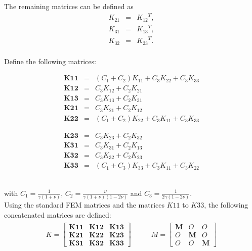 	The remaining matrices can be defined as
	\begin{eqnarray*}
		{K_{21}} & = & {K_{12}}^{T},\\
		{K_{31}} & = & {K_{13}}^{T}, \\
		{K_{32}} & = & {K_{23}}^{T}. \\
	\end{eqnarray*}

	Define the following matrices:\\
	\noindent\begin{minipage}{.5\linewidth}
		\begin{eqnarray*}
			\mathbf{K11} & = & \left(C_1 + C_2 \right) K_{11} + C_3 K_{22} + C_3 K_{33}\\
			\mathbf{K12} & = & C_3 K_{12} + C_2 K_{21}\\
			\mathbf{K13} & = & C_3 K_{13} + C_2 K_{31}\\
			\mathbf{K21} & = & C_3 K_{21} + C_2 K_{12}\\
			\mathbf{K22} & = & \left(C_1 + C_2 \right) K_{22} + C_3 K_{11} + C_3 K_{33}
		\end{eqnarray*}
	\end{minipage}%
	\begin{minipage}{0.8\linewidth}
		\begin{eqnarray*}
			\mathbf{K23} & = & C_3 K_{23} + C_2 K_{32}\\
			\mathbf{K31} & = & C_3 K_{31} + C_2 K_{13}\\
			\mathbf{K32} & = & C_3 K_{32} + C_2 K_{23}\\
			\mathbf{K33} & = & \left(C_1 + C_3 \right) K_{33} + C_3 K_{11} + C_3 K_{22}
		\end{eqnarray*}
	\end{minipage}\\

	with $C_1 = \frac{1}{\gamma(1+\nu)}$, $C_2 =  \frac{\nu}{\gamma (1+\nu)(1-2\nu)}$ and $C_3 =  \frac{1}{2\gamma(1-2\nu)}$.\\

	Using the standard FEM matrices and the matrices $K11$ to $K33$, the following concatenated matrices are defined:\\


	\begin{eqnarray}
		\begin{aligned}
			K = 
			\begin{bmatrix}
				\mathbf{K11} & \mathbf{K12} & \mathbf{K13}\\
				\mathbf{K21} & \mathbf{K22} & \mathbf{K23}\\
				\mathbf{K31} & \mathbf{K32} & \mathbf{K33}
			\end{bmatrix}
		\end{aligned}
		\ \ \ \ \ \ \ \ \
		\begin{aligned}
			M  = 
			\begin{bmatrix}
				\mathbf{M} & {O} & {O}\\
				{O} & \mathbf{M} & {O}\\
				{O} & {O} & \mathbf{M}
			\end{bmatrix}
		\end{aligned}\label{eq:3DFEM:K+M}
	\end{eqnarray}

